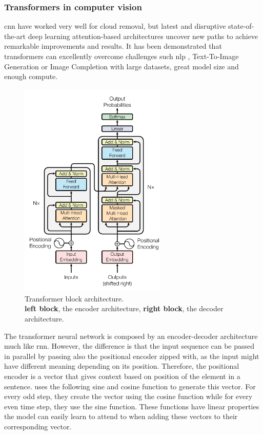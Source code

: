 \documentclass[11pt, a4paper]{article}
\begin{document}
	\subsubsection{Transformers in computer vision}
	\gls{cnn} have worked very well for cloud removal, but latest and disruptive state-of-the-art deep learning attention-based architectures \cite{VaswaniSPUJGKP17} uncover new paths to achieve remarkable improvements and results. It has been demonstrated that transformers can excellently overcome challenges such \gls{nlp} \cite{brown2020language}, Text-To-Image Generation \cite{pmlr-v139-ramesh21a}  or Image Completion \cite{pmlr-v119-chen20s} with large datasets, great model size and enough compute.
	\begin{figure}[H]
		\centering
		\includegraphics[width=7cm]{imgs/relatedwork/transformer-block}
		\caption{Transformer block architecture. \\
			\textbf{left block}, the encoder architecture, \textbf{right block}, the decoder architecture.}
		\label{fig:related-transformer-block}
	\end{figure}
	The transformer neural network is composed by an encoder-decoder architecture  much like \gls{rnn}. However, the difference is that the input sequence can be passed in parallel by passing also the positional encoder zipped with, as the input might have different meaning depending on its position. Therefore, the positional encoder is a vector that gives context based on position of the element in a sentence. \cite{VaswaniSPUJGKP17} uses the following sine and cosine function to generate this vector. For every odd step, they create the vector using the cosine function while for every even time step, they use the sine function. These functions have linear properties the model can easily learn to attend to when adding these vectors to their corresponding vector.
\end{document}
